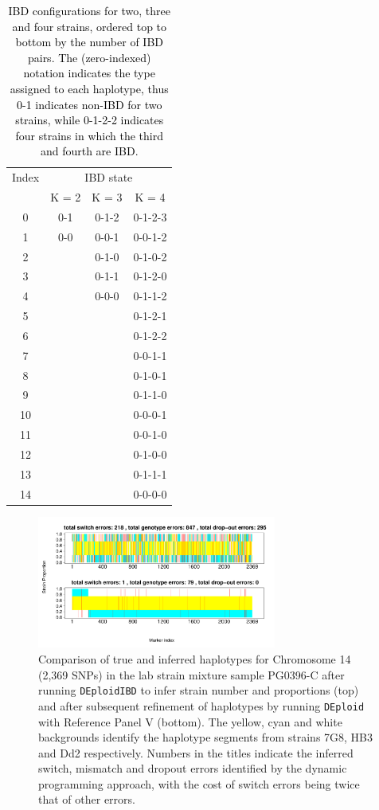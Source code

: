 \documentclass[9pt,lineno]{elife}
\begin{document}
\begin{table}
\begin{tabular}{c|ccc}
  Index & \multicolumn{3}{c}{IBD state} \\
    & K = 2& K = 3 & K = 4 \\ \hline
0   &0-1  & 0-1-2 & 0-1-2-3\\
1	  &0-0	&	0-0-1	& 0-0-1-2	\\
2	  &   	&	0-1-0	&0-1-0-2	\\
3	  &	  	&	0-1-1	&0-1-2-0	\\
4	  &		  &	0-0-0	&0-1-1-2	\\
5	  &		  &	    	&0-1-2-1	\\
6	  &	  	&		    &0-1-2-2	\\
7	  &	  	&		    &0-0-1-1	\\
8	  &	  	&	    	&0-1-0-1	\\
9	  &	  	&		    &0-1-1-0	\\
10	&	  	&		    &0-0-0-1	\\
11	&	  	&		    &0-0-1-0	\\
12	&		  &		    &0-1-0-0	\\
13	&	  	&		    &0-1-1-1	\\
14	&	  	&	    	&0-0-0-0	\\
\end{tabular}
\caption{\textcolor{black}{IBD configurations for two, three and four strains, ordered top to bottom by the number of IBD pairs. The (zero-indexed) notation indicates the type assigned to each haplotype, thus 0-1 indicates non-IBD for two strains, while 0-1-2-2 indicates four strains in which the third and fourth are IBD.} }\label{tab:encode}
\end{table}


\begin{figure}[htp]
    \includegraphics[width=0.7\textwidth]{DEploid_IBD_haps_compare.pdf}
  \caption{Comparison of true and inferred haplotypes for Chromosome 14 (2,369 SNPs) in the lab strain mixture sample PG0396-C after running \texttt{DEploidIBD} to infer strain number and proportions (top) and after subsequent refinement of haplotypes by running \texttt{DEploid} with Reference Panel V (bottom).  The yellow, cyan and white backgrounds identify the haplotype segments from strains 7G8, HB3 and Dd2 respectively. Numbers in the titles indicate the inferred switch, mismatch and dropout errors identified by the dynamic programming approach, with the cost of switch errors being twice that of other errors.
  }
  \label{fig:error}
\end{figure}
\end{document}
